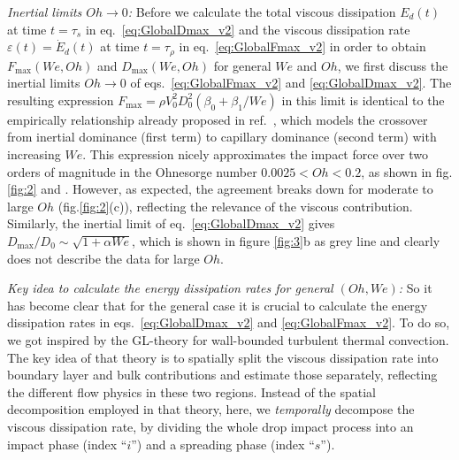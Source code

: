 \documentclass[preprint,amssymb,superscriptaddress,aps,prl,floatfix]{revtex4-1}
\begin{document}
{\it Inertial limits $Oh \to 0$:}
Before we calculate the 
total viscous dissipation $E_d(t) $  at time 
$t = \tau_s$  in eq.\  \eqref{eq:GlobalDmax_v2} and the viscous dissipation
rate $\varepsilon (t) = \dot E_d (t)$
at time $t= \tau_\rho$ in eq.\ \eqref{eq:GlobalFmax_v2} in order to obtain 
$F_\text{max} (We, Oh) $
and $D_\text{max} (We , Oh)$
for general $We$ and $Oh$, we first discuss the inertial limits $Oh \to 0$  
of eqs.\ \eqref{eq:GlobalFmax_v2} and \eqref{eq:GlobalDmax_v2}. 
 The resulting expression $F_{\text{max}} = \rho V_0^2D_0^2\left(\beta_0 + \beta_1/We\right)$ 
 in this limit is identical to 
 the empirically relationship already proposed in ref.\ 
 \cite{sanjayzhang2022prl}, 
 which models the crossover from inertial  dominance (first term) to 
 capillary dominance (second term) with increasing $We$. 
This expression nicely approximates the impact force 
over two orders of magnitude in the Ohnesorge number $0.0025 < Oh < 0.2$, as shown in fig.\ref{fig:2} and \cite{sanjay2024inertia}. However, 
as expected, 
the agreement breaks down for moderate to large $Oh$ (fig.\ref{fig:2}(c)), 
reflecting the relevance of the viscous contribution.
Similarly, 
 the 
inertial limit of 
eq.\ \eqref{eq:GlobalDmax_v2} 
gives 
$D_{\text{max}}/D_0  \sim \sqrt{1 + \alpha We}$, which is shown in 
figure \ref{fig:3}b as grey line and clearly does not describe the data
for large $Oh$.


{\it Key idea to calculate the energy dissipation rates for general $(Oh, We)$:}
So it has become clear  that for the general case it is crucial to
calculate the energy dissipation rates
in eqs.\  \eqref{eq:GlobalDmax_v2} and
\eqref{eq:GlobalFmax_v2}.
To do so,   we 
got inspired by  the GL-theory \cite{grossmann2000scaling,grossmann2001thermal,grossmann2002prandtl,lohse2023ultimate} 
for wall-bounded turbulent thermal convection. 
The key idea of that theory is to spatially split the viscous dissipation rate 
into  boundary layer and  bulk contributions and estimate those separately,
reflecting the different flow physics in these two regions.
Instead of the spatial decomposition employed in that theory, here, 
we {\it temporally}  decompose the viscous dissipation rate, by
dividing the whole drop impact process into an impact phase (index ``$i$'')
and a spreading phase (index ``$s$''). 
\end{document}
